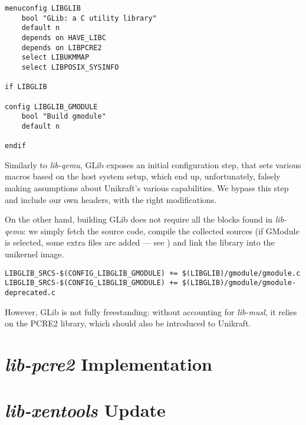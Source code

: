 \begin{lstlisting}
menuconfig LIBGLIB
    bool "GLib: a C utility library"
    default n
    depends on HAVE_LIBC
    depends on LIBPCRE2
    select LIBUKMMAP
    select LIBPOSIX_SYSINFO

if LIBGLIB

config LIBGLIB_GMODULE
    bool "Build gmodule"
    default n

endif
\end{lstlisting}

Similarly to \textit{lib-qemu}, GLib exposes an initial configuration step, that sets various macros based on the host system setup, which end up, unfortunately, falsely making assumptions about Unikraft's various capabilities.
We bypass this step and include our own headers, with the right modifications.

On the other hand, building GLib does not require all the blocks found in \textit{lib-qemu}: we simply fetch the source code, compile the collected sources (if GModule is selected, some extra files are added — see ) and link the library into the unikernel image.

\begin{lstlisting}
LIBGLIB_SRCS-$(CONFIG_LIBGLIB_GMODULE) += $(LIBGLIB)/gmodule/gmodule.c
LIBGLIB_SRCS-$(CONFIG_LIBGLIB_GMODULE) += $(LIBGLIB)/gmodule/gmodule-deprecated.c
\end{lstlisting}

However, GLib is not fully freestanding: without accounting for \textit{lib-musl}, it relies on the PCRE2 library, which should also be introduced to Unikraft.

\section{\textit{lib-pcre2} Implementation}
\label{impl-lib-pcre2}

\section{\textit{lib-xentools} Update}
